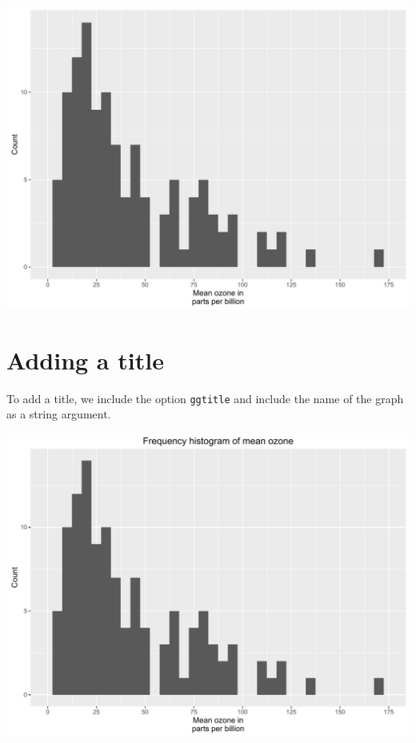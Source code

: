 \begin{center}\includegraphics[width=0.55\linewidth]{figures/histogram_7-1} \end{center}

\section{Adding a title}\label{adding-a-title}

To add a title, we include the option \texttt{ggtitle} and include the
name of the graph as a string argument.

\begin{Shaded}
\begin{Highlighting}[]
\StringTok{ }\NormalTok{(} \StringTok{ }
\StringTok{      }\NormalTok{(}\NormalTok{(}  \NormalTok{) +}
\StringTok{      }\NormalTok{(} \NormalTok{,}
\StringTok{        } \NormalTok{(}\NormalTok{, }\NormalTok{, }\NormalTok{),}
\StringTok{        }\NormalTok{(}\NormalTok{, }\NormalTok{)) +}
\StringTok{      }\NormalTok{(} \NormalTok{) +}
\StringTok{      }\NormalTok{(}\NormalTok{)}
\end{Highlighting}
\end{Shaded}

\begin{center}\includegraphics[width=0.55\linewidth]{figures/histogram_8-1} \end{center}

